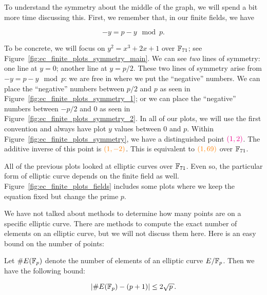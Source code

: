 To understand the symmetry about the middle of the graph,
we will spend a bit more time discussing this.
First, we remember that, in our \glspl{finite field}, we have

\begin{equation}
    -y = p-y \mod p.
\end{equation}



\noindent
To be concrete, we will focus on $y^{2} = x^{3} + 2x + 1$ over $\mathbb{F}_{71}$;
see Figure~\ref{fig:ec_finite_plots_symmetry_main}.
We can see \emph{two} lines of symmetry:
one line at $y=0$; another line at $y=p/2$.
These two lines of symmetry arise from $-y = p-y \mod p$:
we are free in where we put the ``negative'' numbers.
We can place the ``negative'' numbers between $p/2$ and $p$ as seen in
Figure~\ref{fig:ec_finite_plots_symmetry_1};
or we can place the ``negative'' numbers between $-p/2$ and $0$ as seen in
Figure~\ref{fig:ec_finite_plots_symmetry_2}.
In all of our plots, we will use the first convention
and always have plot $y$ values between $0$ and $p$.
Within Figure~\ref{fig:ec_finite_plots_symmetry},
we have a distinguished point $\color{magenta}{\left( 1,2 \right)}$.
The additive inverse of this point is
$\color{orange}{\left( 1,-2 \right)}$.
This is equivalent to $\color{orange}{\left( 1,69 \right)}$
over $\mathbb{F}_{71}$.

All of the previous plots looked at \glspl{elliptic curve} over $\mathbb{F}_{71}$.
Even so, the particular form of \gls{elliptic curve} depends on the
\gls{finite field} as well.
Figure~\ref{fig:ec_finite_plots_fields} includes some plots where
we keep the equation fixed but change the prime $p$.



We have not talked about methods to determine how many points
are on a specific \gls{elliptic curve}.
There are methods to compute the exact number of
elements on an \gls{elliptic curve},
but we will not discuss them here.
Here is an easy bound on the number of points:

\begin{thm}
\label{thm:hasse_bound}
Let $\#E(\mathbb{F}_{p})$ denote the number of elements of an \gls{elliptic curve}
$E/\mathbb{F}_{p}$.
Then we have the following bound:

\begin{equation}
    \abs{\#E(\F_{p}) - \parens{p+1}} \le 2\sqrt{p}.
\end{equation}
\end{thm}

